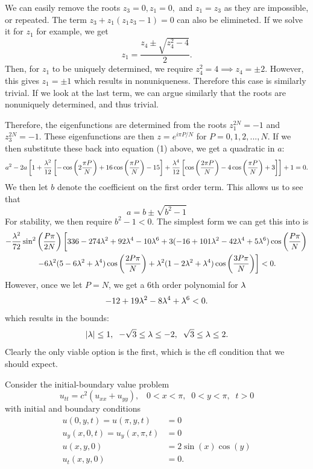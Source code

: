  
 We can easily remove the roots $z_3=0, z_1=0,$ and $z_1=z_3$ as they are impossible, or repeated. The term $z_3+z_1(z_1z_3-1)=0$ can also be elimineted. If we solve it for $z_1$ for example, we get
 $$z_1=\frac{z_4\pm\sqrt{z_4^2-4}}{2}.$$
 Then, for $z_1$ to be uniquely determined, we require $z_4^2=4\implies z_4=\pm 2.$ However, this gives $z_1=\pm 1$ which results in nonuniqueness. Therefore this case is similarly trivial. If we look at the last term, we can argue similarly that the roots are nonuniquely determined, and thus trivial.
 \par Therefore, the eigenfunctions are determined from the roots $z_1^{2N}=-1$ and $z_3^{2N}=-1.$ These eigenfunctions are then $z=e^{i\pi P/N}$ for $P=0,1,2,...,N$. If we then substitute these back into equation (1) above, we get a quadratic in $a$:
 $$a^2-2a\left[1+\frac{\lambda^2}{12}\left[-\cos\left(2\frac{\pi P}{N}\right)+16\cos\left(\frac{\pi P}{N}\right)-15\right]+\frac{\lambda^4}{12}\left[\cos\left(\frac{2\pi P}{N}\right)-4\cos\left(\frac{\pi P}{N}\right)+3\right]\right]+1=0.$$
 We then let $b$ denote the coefficient on the first order term. This allows us to see that
 $$a=b\pm\sqrt{b^2-1}$$
 For stability, we then require $b^2-1<0.$
 The simplest form we can get this into is
 \begin{multline*}
 -\frac{\lambda^2}{72}\sin^2\left(\frac{P\pi}{2N}\right)\left[336-274\lambda^2+92\lambda^4-10\lambda^6+3(-16+101\lambda^2-42\lambda^4+5\lambda^6)\cos\left(\frac{P\pi}{N}\right)\right.\\
\left. -6\lambda^2(5-6\lambda^2+\lambda^4)\cos\left(\frac{2 P\pi}{N}\right)+\lambda^2(1-2\lambda^2+\lambda^4)\cos\left(\frac{3 P\pi}{N}\right)\right]<0.
 \end{multline*}
 However, once we let $P=N$, we get a 6th order polynomial for $\lambda$
 $$-12+19\lambda^2-8\lambda^4+\lambda^6<0.$$
 which results in the bounds:
 $$|\lambda|\leq 1,\;\; -\sqrt{3}\leq\lambda\leq-2,\;\; \sqrt{3}\leq \lambda\leq2.$$
 Clearly the only viable option is the first, which is the cfl condition that we should expect.
 

\eenum
\item Consider the initial-boundary value problem
$$u_{tt}=c^2(u_{xx}+u_{yy}),\;\;\; 0<x<\pi,\;\;0<y<\pi,\;\;t>0$$
with initial and boundary conditions
\begin{align*}
u(0,y,t)=u(\pi,y,t)&=0\\
u_y(x,0,t)=u_y(x,\pi,t)&=0\\
u(x,y,0)&=2\sin(x)\cos(y)\\
u_t(x,y,0)&=0.
\end{align*}

